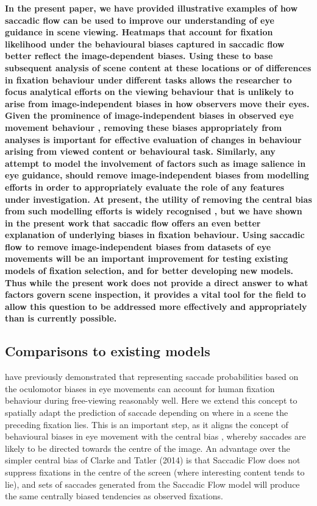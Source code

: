 \documentclass[a4paper, twocolumn, oneside, 11pt]{article}
\begin{document}
\textbf{In the present paper, we have provided illustrative examples of how saccadic flow can be used to improve our understanding of eye guidance in scene viewing. Heatmaps that account for fixation likelihood under the behavioural biases captured in saccadic flow better reflect the image-dependent biases. Using these to base subsequent analysis of scene content at these locations or of differences in fixation behaviour under different tasks allows the researcher to focus analytical efforts on the viewing behaviour that is unlikely to arise from image-independent biases in how observers move their eyes. Given the prominence of image-independent biases in observed eye movement behaviour \cite{tatler-vincent2009}, removing these biases appropriately from analyses is important for effective evaluation of changes in behaviour arising from viewed content or behavioural task. Similarly, any attempt to model the involvement of factors such as image salience in eye guidance, should remove image-independent biases from modelling efforts in order to appropriately evaluate the role of any features under investigation. At present, the utility of removing the central bias from such modelling efforts is widely recognised \citep{borji2013,Tatler2011}, but we have shown in the present work that saccadic flow offers an even better explanation of underlying biases in fixation behaviour. Using saccadic flow to remove image-independent biases from datasets of eye movements will be an important improvement for testing existing models of fixation selection, and for better developing new models. Thus while the present work does not provide a direct answer to what factors govern scene inspection, it provides a vital tool for the field to allow this question to be addressed more effectively and appropriately than is currently possible.}

\subsection{Comparisons to existing models}
\citep{tatler-vincent2009} have previously demonstrated that representing saccade probabilities based on the oculomotor biases in eye movements can account for human fixation behaviour during free-viewing reasonably well. Here we extend this concept to spatially adapt the prediction of saccade depending on where in a scene the preceding fixation lies. This is an important step, as it aligns the concept of behavioural biases in eye movement with the central bias \citep{tatler2007}, whereby saccades are likely to be directed towards the centre of the image. An advantage over the simpler central bias of Clarke and Tatler (2014) is that Saccadic Flow does not suppress fixations in the centre of the screen (where interesting content tends to lie), and sets of saccades generated from the Saccadic Flow model will produce the same centrally biased tendencies as observed fixations.
\end{document}
